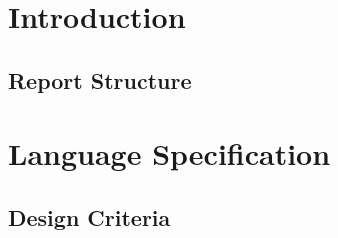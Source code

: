


\frontmatter %
\newcommand{\ind}[1]{}

\ind{FormaliaForside}
\cleardoublepage %

\ind{FormaliaTitelblad}
\cleardoublepage
\ind{FormaliaProlog.tex}
\ind{FormaliaUnderskriftsside.tex}
\cleardoublepage



\setlength\parskip{0ex} %
\tableofcontents* %
\setlength{\parskip}{3mm} %



\label{marker}
\mainmatter

\pagestyle{custom}

\renewcommand{\ind}[1]{}
\chapter{Introduction}
\ind{FormaliaIndledning}
\ind{EnviromentForThisProject}
\ind{SolutionInBars}
\ind{ProblemStatement}
\section{Report Structure}

\renewcommand{\ind}[1]{}
\chapter{Language Specification}
\ind{ParadigmsOfProgrammingLanguage}
\section{Design Criteria}
\ind{ProgrammingAnArduino-basedDrinks-machine}
\ind{DesignCriteriaInThisProject}

